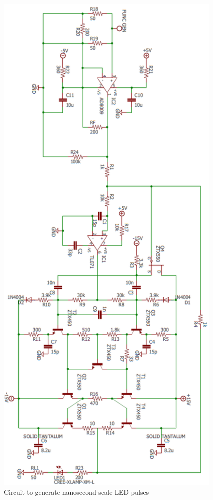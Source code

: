 \documentclass{article}
\begin{document}
        \begin{figure}[h]
            \centering
            \includegraphics[scale=0.65]{img/nanosecond_led_circuit}
            \caption{Circuit to generate nanosecond-scale LED pulses}
            \label{fig:nanosecond_led_circuit}
        \end{figure}
    
\end{document}
